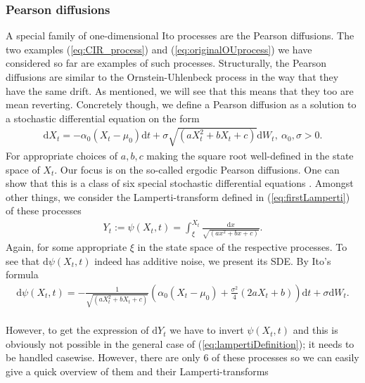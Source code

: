 \subsubsection{Pearson diffusions}
A special family of one-dimensional Ito processes are the Pearson diffusions. The two examples (\ref{eq:CIR_process}) and (\ref{eq:originalOUprocess}) we have considered so far are examples of such processes. Structurally, the Pearson diffusions are similar to the Ornstein-Uhlenbeck process in the way that they have the same drift. As mentioned, we will see that this means that they too are mean reverting. Concretely though, we define a Pearson diffusion as a solution to a stochastic differential equation on the form
\begin{align}
    \mathrm{d}X_t = -\alpha_0 \left(X_t - \mu_0\right)\mathrm{d}t + \sigma\sqrt{\left(aX_t^2 + bX_t + c\right)}\mathrm{d}W_t, \: \alpha_0, \sigma > 0. \label{eq:pearsonDiffusion}
\end{align}
For appropriate choices of $a, b, c$ making the square root well-defined in the state space of $X_t$. Our focus is on the so-called ergodic Pearson diffusions. One can show that this is a class of six special stochastic differential equations \cite[p.36]{StatisticalMethodsForSDE}. Amongst other things, we consider the Lamperti-transform defined in (\ref{eq:firstLamperti}) of these processes
\begin{align}
    Y_t := \psi\left(X_t, t\right) = \int_{\xi}^{X_t} \frac{\mathrm{d}x}{\sqrt{\left(ax^2 + bx + c\right)}}. \label{eq:lampertiDefinition}
\end{align}
Again, for some appropriate $\xi$ in the state space of the respective processes. To see that $\mathrm{d}\psi\left(X_t, t\right)$ indeed has additive noise, we present its SDE. By Ito's formula
\begin{align}
    \mathrm{d}\psi\left(X_t, t\right) = - \frac{1}{\sqrt{\left(aX_t^2 + bX_t + c\right)}}\left(\alpha_0\left(X_t - \mu_0\right) + \frac{\sigma^2}{4}\left(2aX_t + b\right)\right)\mathrm{d}t + \sigma \mathrm{d}W_t.
\end{align}\\
However, to get the expression of $\mathrm{d}Y_t$ we have to invert $\psi\left(X_t, t\right)$ and this is obviously not possible in the general case of (\ref{eq:lampertiDefinition}); it needs to be handled casewise. However, there are only 6 of these processes so we can easily give a quick overview of them \cite[p.36]{StatisticalMethodsForSDE} and their Lamperti-transforms
